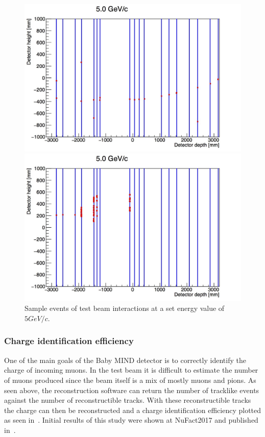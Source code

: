 \begin{figure}[h!]
\centering
\includegraphics[width=\textwidth]{figures/oldStudies/m5GeVevent2.jpg}

\includegraphics[width=\textwidth]{figures/oldStudies/m5GeVevent3.jpg}
\caption{Sample events of test beam interactions at a set energy value of $5GeV/c$.}
\label{fig:EventsInitial}
\end{figure}

\subsubsection{Charge identification efficiency}
One of the main goals of the Baby MIND detector is to correctly identify the charge of incoming muons. In the test beam it is difficult to estimate the number of muons produced since the beam itself is a mix of mostly muons and pions. As seen above, the reconstruction software can return the number of tracklike events against the number of reconstructible tracks. With these reconstructible tracks the charge can then be reconstructed and a charge identification efficiency plotted as seen in~. Initial results of this study were shown at NuFact2017 and published in~\cite{82Uppsala}.


